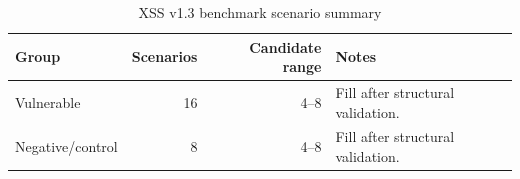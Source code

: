 
\begin{table}[htbp]
\centering
\caption{XSS v1.3 benchmark scenario summary}
\label{tab:xss-v13-benchmark-summary}
\begin{tabular}{lrrl}
\hline
Group & Scenarios & Candidate range & Notes \\
\hline
Vulnerable & 16 & 4--8 & Fill after structural validation. \\
Negative/control & 8 & 4--8 & Fill after structural validation. \\
\hline
\end{tabular}
\end{table}
